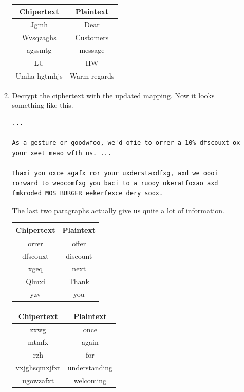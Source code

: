 \documentclass[12pt, a4paper]{article}
\begin{document}
\begin{enumerate}[label=(\alph*)]
\begin{enumerate}[label=(\arabic*)]
      \begin{tabular}{|cc|}
        \hline \textbf{Chipertext} & \textbf{Plaintext} \\\hline
        Jgmh & Dear \\
        Wvsqzaghs & Customers \\
        agssmtg & message \\
        LU & HW \\
        Umha hgtmhjs & Warm regards \\\hline
      \end{tabular}

      \vspace{0.5\baselineskip}
      \item Decrypt the ciphertext with the updated mapping. Now it looks something
      like this.
      \begin{Verbatim}[frame=single, fontsize=\scriptsize, breaklines]
...

As a gesture or goodwfoo, we'd ofie to orrer a 10% dfscouxt ox your xeet meao wfth us. ...

Thaxi you oxce agafx ror your uxderstaxdfxg, axd we oooi rorward to weocomfxg you baci to a ruooy okeratfoxao axd fmkroded MOS BURGER eekerfexce dery soox.
      \end{Verbatim}
      The last two paragraphs actually give us quite a lot of information.

      \begin{tabular}{|cc|}
        \hline \textbf{Chipertext} & \textbf{Plaintext} \\\hline
        orrer & offer \\
        dfscouxt & discount \\
        xgeq & next \\
        Qlmxi & Thank \\
        yzv & you \\\hline
      \end{tabular}\quad
      \begin{tabular}{|cc|}
        \hline \textbf{Chipertext} & \textbf{Plaintext} \\\hline
        zxwg & once \\
        mtmfx & again \\
        rzh & for \\
        vxjghsqmxjfxt & understanding \\
        ugowzafxt & welcoming \\\hline
      \end{tabular}


\end{enumerate}
\end{enumerate}
\end{document}
